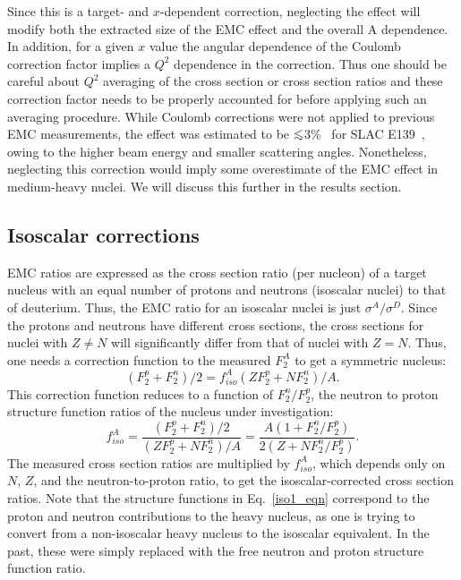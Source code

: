 Since this is a target- and $x$-dependent correction, neglecting the effect
will modify both the extracted size of the EMC effect and the overall A
dependence. In addition, for a given $x$ value the angular dependence of the
Coulomb correction factor implies a $Q^2$ dependence in the correction. Thus
one should be careful about $Q^2$ averaging of the cross section or cross
section ratios and these correction factor needs to be properly accounted for
before applying such an averaging procedure.  While Coulomb corrections
were not applied to previous EMC measurements, the effect was estimated to be
$\ltorder$3\%~\cite{Arrington:2003nt} for SLAC E139~\cite{slace139}, owing to
the higher beam energy and smaller scattering angles. Nonetheless, neglecting
this correction would imply some overestimate of the EMC effect in medium-heavy
nuclei. We will discuss this further in the results section.


\subsection{Isoscalar corrections}\label{iso.ssec}

EMC ratios are expressed as the cross section ratio (per nucleon) of a target
nucleus with an equal number of protons and neutrons (isoscalar nuclei) to
that of deuterium. Thus, the EMC ratio for an isoscalar nuclei is just
$\sigma^A/\sigma^D$. Since the protons and neutrons have different cross
sections, the cross sections for  nuclei with $Z \neq N$ will significantly
differ from that of nuclei with $Z=N$. Thus, one needs a correction function
to the measured $F_2^A$ to get a symmetric nucleus:
%
\begin{equation} \label{iso1_eqn}
(F_2^p+F_2^n)/2 = f_{iso}^A (Z F_2^p+N F_2^n) / A.
\end{equation} 
%
This correction function reduces to a function of $F_2^n/F_2^p$, the neutron to
proton structure function ratios of the nucleus under investigation:
%
\begin{equation} \label{iso2_eqn}
f_{iso}^A = 
\frac{(F_2^p+F_2^n)/2}{(Z F_2^p + N F_2^n )/A} =
\frac{A (1+ F_2^n/F_2^p)}{2 (Z + N F_2^n/F_2^p)}.
\end{equation} 
%
The measured cross section ratios are multiplied by $f_{iso}^A$, which
depends only on $N$, $Z$, and the neutron-to-proton ratio, to get
the isoscalar-corrected cross section ratios.  Note that the structure
functions in Eq.~\ref{iso1_eqn} correspond to the proton and neutron
contributions to the heavy nucleus, as one is trying to convert from a
non-isoscalar heavy nucleus to the isoscalar equivalent.  In the past, these
were simply replaced with the free neutron and proton structure function
ratio.

